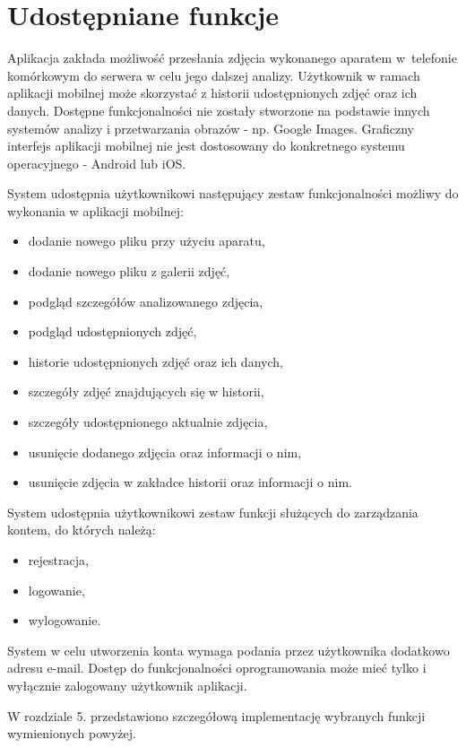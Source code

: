 \section{Udostępniane funkcje}
Aplikacja zakłada możliwość przesłania zdjęcia wykonanego aparatem w~telefonie komórkowym do serwera w celu jego dalszej analizy. Użytkownik w ramach aplikacji mobilnej może skorzystać z historii udostępnionych zdjęć oraz ich danych. Dostępne funkcjonalności nie zostały stworzone na podstawie innych systemów analizy i przetwarzania obrazów - np. Google Images. Graficzny interfejs aplikacji mobilnej nie jest dostosowany do konkretnego systemu operacyjnego - Android lub iOS. 

System udostępnia użytkownikowi następujący zestaw funkcjonalności możliwy do wykonania w aplikacji mobilnej:
\begin{itemize}[align=left]

	\item dodanie nowego pliku przy użyciu aparatu,
	\item dodanie nowego pliku z galerii zdjęć,
	\item podgląd szczegółów analizowanego zdjęcia,
	\item podgląd udostępnionych zdjęć,
	\item historie udostępnionych zdjęć oraz ich danych,
	\item szczegóły zdjęć znajdujących się w historii,
	\item szczegóły udostępnionego aktualnie zdjęcia,
	\item usunięcie dodanego zdjęcia oraz informacji o nim,
	\item usunięcie zdjęcia w zakładce historii oraz informacji o nim.
	
\end{itemize}

System udostępnia użytkownikowi zestaw funkcji służących do zarządzania kontem, do których należą:
\begin{itemize}[align=left]
	\item rejestracja,
	\item logowanie,	
	\item wylogowanie.
\end{itemize}

System w celu utworzenia konta wymaga podania przez użytkownika dodatkowo adresu e-mail. Dostęp do funkcjonalności oprogramowania może mieć tylko i wyłącznie zalogowany użytkownik aplikacji. 

W rozdziale 5. przedstawiono szczegółową implementację wybranych funkcji wymienionych powyżej.